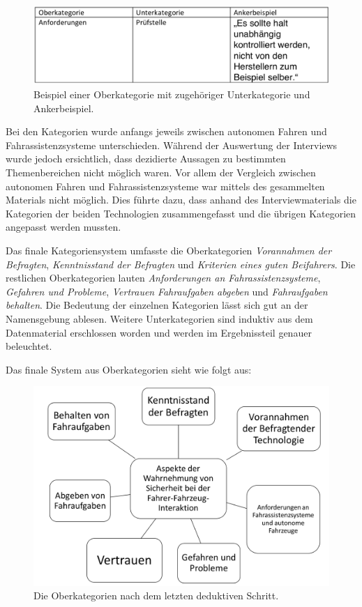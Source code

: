 \documentclass[12pt]{article}
\begin{document}
\begin{figure}[htp]
  \centering
  \includegraphics[width=13cm]{Ankerbeispiel.png}
  \caption{Beispiel einer Oberkategorie mit zugehöriger Unterkategorie und Ankerbeispiel.}
  \label{fig:OberkategorienBeispiel}
\end{figure}

Bei den Kategorien wurde anfangs jeweils zwischen autonomen Fahren und Fahrassistenzsysteme unterschieden. Während der Auswertung der Interviews wurde jedoch ersichtlich, dass dezidierte Aussagen zu bestimmten Themenbereichen nicht möglich waren. Vor allem der Vergleich zwischen autonomen Fahren und Fahrassistenzsysteme war mittels des gesammelten Materials nicht möglich. Dies führte dazu, dass anhand des Interviewmaterials die Kategorien der beiden Technologien zusammengefasst und die übrigen Kategorien angepasst werden mussten.

Das finale Kategoriensystem umfasste die Oberkategorien \emph{Vorannahmen der Befragten}, \emph{Kenntnisstand der Befragten} und \emph{Kriterien eines guten Beifahrers}. Die restlichen Oberkategorien lauten \emph{Anforderungen an Fahrassistenzsysteme}, \emph{Gefahren und Probleme}, \emph{Vertrauen} \emph{Fahraufgaben abgeben} und \emph{Fahraufgaben behalten}. Die Bedeutung der einzelnen Kategorien lässt sich gut an der Namensgebung ablesen. Weitere Unterkategorien sind induktiv aus dem Datenmaterial erschlossen worden und werden im Ergebnissteil genauer beleuchtet.

Das finale System aus Oberkategorien sieht wie folgt aus:

\begin{figure}[htp]
  \centering
  \includegraphics[width=13cm]{Kategoriensystem.png}
  \caption{Die Oberkategorien nach dem letzten deduktiven Schritt.}
  \label{fig:OberkategorienFinal}
\end{figure}
\end{document}
